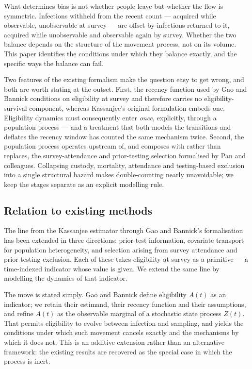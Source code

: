 What determines bias is not whether people leave but whether the flow is symmetric. Infections withheld from the recent count --- acquired while observable, unobservable at survey --- are offset by infections returned to it, acquired while unobservable and observable again by survey. Whether the two balance depends on the structure of the movement process, not on its volume. This paper identifies the conditions under which they balance exactly, and the specific ways the balance can fail.

Two features of the existing formalism make the question easy to get wrong, and both are worth stating at the outset. First, the recency function used by Gao and Bannick conditions on eligibility at survey and therefore carries no eligibility-survival component, whereas Kassanjee's original formulation embeds one. Eligibility dynamics must consequently enter \emph{once}, explicitly, through a population process --- and a treatment that both models the transitions and deflates the recency window has counted the same mechanism twice. Second, the population process operates upstream of, and composes with rather than replaces, the survey-attendance and prior-testing selection formalised by Pan and colleagues. Collapsing custody, mortality, attendance and testing-based exclusion into a single structural hazard makes double-counting nearly unavoidable; we keep the stages separate as an explicit modelling rule.

\subsection{Relation to existing methods}

The line from the Kassanjee estimator through Gao and Bannick's formalisation has been extended in three directions: prior-test information, covariate transport for population heterogeneity, and selection arising from survey attendance and prior-testing exclusion. Each of these takes eligibility at survey as a primitive --- a time-indexed indicator whose value is given. We extend the same line by modelling the dynamics of that indicator.

The move is stated simply. Gao and Bannick define eligibility \(A(t)\) as an indicator; we retain their estimand, their recency function and their assumptions, and refine \(A(t)\) as the observable marginal of a stochastic state process \(Z(t)\). That permits eligibility to evolve between infection and sampling, and yields the conditions under which such movement cancels exactly and the mechanisms by which it does not. This is an additive extension rather than an alternative framework: the existing results are recovered as the special case in which the process is inert.

